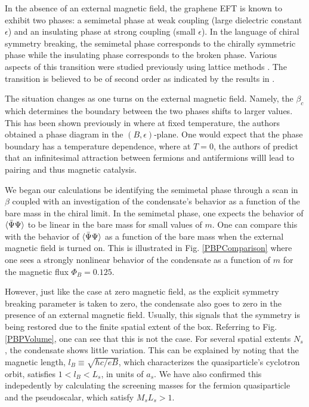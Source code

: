 \documentclass[aps,prd,twocolumn,showpacs,superscriptaddress,groupedaddress]{revtex4}  %
\begin{document}
In the absence of an external magnetic field, the graphene EFT is known to exhibit two phases: a semimetal phase at weak coupling (large dielectric constant $\epsilon$) and an insulating phase at strong coupling (small $\epsilon$). 
In the language of chiral symmetry breaking, the semimetal phase corresponds to the chirally symmetric phase while the insulating phase corresponds to the broken phase.
Various aspects of this transition were studied previously using lattice methods \cite{Drut1, Drut2, Hands1, Giedt}. The transition is believed to be of second order as indicated by the results in \cite{Drut2}. 

The situation changes as one turns on the external magnetic field. Namely, the $\beta_c$ which determines the boundary between the two phases shifts to larger values. This has been shown previously in \cite{Polikarpov} where at fixed temperature, the authors
obtained a phase diagram in the $(B, \epsilon)$-plane. One would expect that the phase boundary has a temperature dependence, where at $T=0$, the authors of \cite{Miransky1,Miransky2,Miransky3,Miransky4,MiranskyGraphene1,MiranskyGraphene2,MiranskyGraphene3} predict that an infinitesimal attraction between fermions and antifermions willl lead to pairing and thus magnetic catalysis.

We began our calculations be identifying the semimetal phase through a scan in $\beta$ coupled with an investigation of the condensate's behavior as a function of the bare mass in the chiral limit. In the semimetal phase, one expects the behavior of ${\langle {\bar \Psi} \Psi \rangle}$ to be linear in the bare mass for small values of $m$. 
One can compare this with the behavior of ${\langle {\bar \Psi} \Psi \rangle}$ as a function of the bare mass when the external magnetic field is turned on. This is illustrated in Fig. \ref{PBPComparison} where one sees a strongly nonlinear behavior of the condensate as a function of $m$ for the magnetic flux $\Phi_B = 0.125$.

However, just like the case at zero magnetic field, as the explicit symmetry breaking parameter is taken to zero, the condensate also goes to zero in the presence of an external magnetic field. Usually, this signals that the symmetry is being restored due to the finite spatial extent of the box. Referring to Fig. \ref{PBPVolume}, one can see that this is not the
case. For several spatial extents $N_s$, the condensate shows little variation. This can be explained by noting that the magnetic length, $l_B \equiv \sqrt{\hbar c/eB}$, which characterizes the quasiparticle's cyclotron orbit, satisfies $1 < l_B < L_s$, in units of $a_s$. We have also confirmed this indepedently by calculating the screening
masses for the fermion quasiparticle and the pseudoscalar, which satisfy $M_s L_s > 1$. 
 
\end{document}

